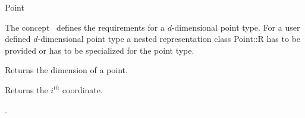 
\ccHtmlNoClassLinks
\begin{ccRefConcept}{Point}


\ccDefinition
  
The concept \ccClassTemplateName\ defines the requirements for a 
$d$-dimensional point type.
For a user defined $d$-dimensional point type a nested representation class
Point::R has to be provided or  has to be
specialized for the point type. 


\ccOperations

{Returns the dimension of a point.}

{Returns the $i^{th}$ coordinate.}

\ccHasModels

.

\end{ccRefConcept}


